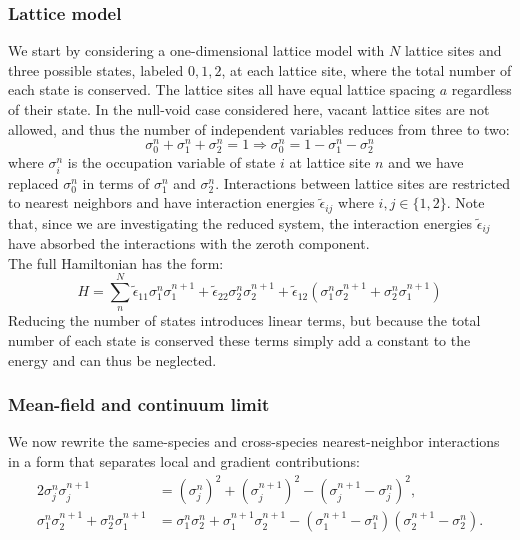 \documentclass[12pt]{article}
\begin{document}
\subsubsection{Lattice model}
We start by considering a one-dimensional lattice model with \(N\) lattice sites and three possible states, labeled \(0, 1, 2\), at each lattice site, where the total number of each state is conserved.
The lattice sites all have equal lattice spacing \(a\) regardless of their state.
In the null-void case considered here, vacant lattice sites are not allowed, and thus the number of independent variables reduces from three to two:
\[
\sigma_0^{n} + \sigma_1^{n} + \sigma_2^{n} = 1 \Rightarrow \sigma_0^{n} = 1 - \sigma_1^{n} - \sigma_2^{n}
\]
where \(\sigma_i^n\) is the occupation variable of state \(i\) at lattice site \(n\) and we have replaced \(\sigma_0^n\) in terms of \(\sigma_1^n\) and \(\sigma_2^n\).
Interactions between lattice sites are restricted to nearest neighbors and have interaction energies \(\tilde{\epsilon}_{ij}\) where \(i,j \in \{1,2\}\).
Note that, since we are investigating the reduced system, the interaction energies \(\tilde{\epsilon}_{ij}\) have absorbed the interactions with the zeroth component.\\
The full Hamiltonian has the form:
\begin{equation}
\label{eq:ising_hamiltonian}
H = \sum_{n}^{N} \tilde{\epsilon}_{11} \sigma_1^{n} \sigma_1^{n+1} 
+ \tilde{\epsilon}_{22} \sigma_2^{n} \sigma_2^{n+1} 
+ \tilde{\epsilon}_{12} \left(\sigma_1^{n} \sigma_2^{n+1} + \sigma_2^{n} \sigma_1^{n+1}\right)
\end{equation}
Reducing the number of states introduces linear terms, but because the total number of each state is conserved these terms simply add a constant to the energy and can thus be neglected.

\subsubsection{Mean-field and continuum limit}

We now rewrite the same-species and cross-species nearest-neighbor interactions in a form that separates local and gradient contributions:
\[
\begin{aligned}
    2\sigma_j^n\sigma_j^{n+1}
    &= (\sigma_j^n)^2 + (\sigma_j^{n+1})^2 - (\sigma_j^{n+1}-\sigma_j^n)^2, \\
    \sigma_1^n \sigma_2^{n+1} + \sigma_2^n \sigma_1^{n+1}
    &= \sigma_1^n \sigma_2^n + \sigma_1^{n+1}\sigma_2^{n+1}
    - (\sigma_1^{n+1}-\sigma_1^n)(\sigma_2^{n+1}-\sigma_2^n).
\end{aligned}
\]
\end{document}
